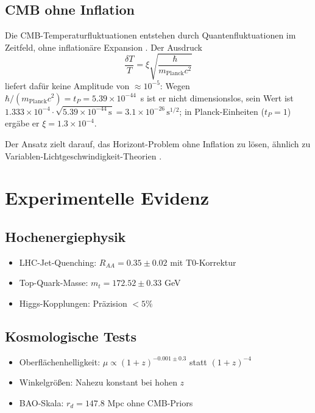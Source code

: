 	\subsection{CMB ohne Inflation}
	
	Die CMB-Temperaturfluktuationen entstehen durch Quantenfluktuationen im Zeitfeld, ohne inflationäre Expansion \cite{pascher2025cmb}. Der Ausdruck
	\begin{equation}
		\frac{\delta T}{T} = \xi \sqrt{\frac{\hbar}{m_{\text{Planck}}c^2}}
	\end{equation}
	liefert dafür keine Amplitude von $\approx 10^{-5}$: Wegen $\hbar/(m_{\text{Planck}}c^2) = t_P = 5.39\times10^{-44}$~s ist er nicht dimensionslos, sein Wert ist $1.333\times10^{-4}\cdot\sqrt{5.39\times10^{-44}\,\mathrm{s}} = 3.1\times10^{-26}\,\mathrm{s}^{1/2}$; in Planck-Einheiten ($t_P = 1$) ergäbe er $\xi = 1.3\times10^{-4}$.
	
	Der Ansatz zielt darauf, das Horizont-Problem ohne Inflation zu lösen, ähnlich zu Variablen-Lichtgeschwindigkeit-Theorien \cite{albrecht1999, barrow1999}.
	
	\section{Experimentelle Evidenz}
	
	\subsection{Hochenergiephysik}
	\begin{itemize}
		\item LHC-Jet-Quenching: $R_{AA} = 0.35 \pm 0.02$ mit T0-Korrektur \cite{cms2024, alice2023}
		\item Top-Quark-Masse: $m_t = 172.52 \pm 0.33$ GeV \cite{cms2023top}
		\item Higgs-Kopplungen: Präzision $< 5\%$ \cite{atlas2023higgs}
	\end{itemize}
	
	\subsection{Kosmologische Tests}
	\begin{itemize}
		\item Oberflächenhelligkeit: $\mu \propto (1+z)^{-0.001\pm0.3}$ statt $(1+z)^{-4}$ \cite{lerner2014}
		\item Winkelgrößen: Nahezu konstant bei hohen $z$ \cite{lopez2010}
		\item BAO-Skala: $r_d = 147.8$ Mpc ohne CMB-Priors \cite{desi2025}
	\end{itemize}
	
